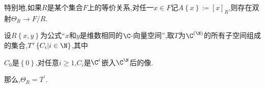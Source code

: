 \begin{remark}{}{}
	特别地,如果$R$是某个集合$F$上的等价关系,对任一$x\in F$记$A\left\{x\right\}\coloneq\left[x\right]_{R}$,则存在双射$\Theta_{R}\to F/R$.
\end{remark}

\begin{example}{}{}
	设$R\left\{x,y\right\}$为公式``$x$和$y$是维数相同的$\C$-向量空间'',取$T$为$\C^{\left(\N\right)}$的所有子空间组成的集合,$T^{\prime}\left\{C_{i}\middle|i\in\N\right\}$,其中
	\begin{center}
		$C_{0}$是$\left\{0\right\}$,对任意$i\geq 1$,$C_{i}$是$\C^{i}$嵌入$\C^{\N}$后的像.
	\end{center}
	那么,$\Theta_{R}=T^{\prime}$.
\end{example}























